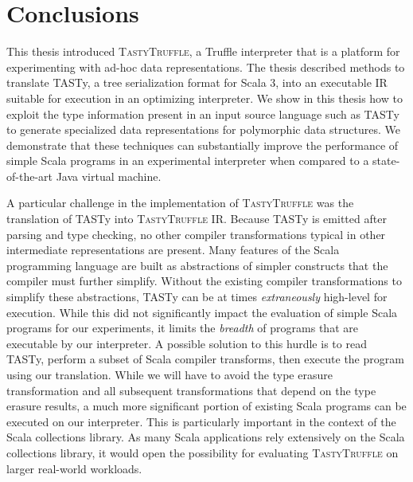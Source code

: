\chapter{Conclusions}

This thesis introduced \textsc{TastyTruffle}, a Truffle interpreter that is a platform for experimenting with ad-hoc data representations.
The thesis described methods to translate TASTy, a tree serialization format for Scala 3, into an executable IR suitable for execution in an optimizing interpreter.
We show in this thesis how to exploit the type information present in an input source language such as TASTy to generate specialized data representations for polymorphic data structures.
We demonstrate that these techniques can substantially improve the performance of simple Scala programs in an experimental interpreter when compared to a state-of-the-art Java virtual machine.

A particular challenge in the implementation of \textsc{TastyTruffle} was the translation of TASTy into \textsc{TastyTruffle} IR.
Because TASTy is emitted after parsing and type checking, no other compiler transformations typical in other intermediate representations are present.
Many features of the Scala programming language are built as abstractions of simpler constructs that the compiler must further simplify.
Without the existing compiler transformations to simplify these abstractions, TASTy can be at times \textit{extraneously} high-level for execution.
While this did not significantly impact the evaluation of simple Scala programs for our experiments, it limits the \textit{breadth} of programs that are executable by our interpreter.
A possible solution to this hurdle is to read TASTy, perform a subset of Scala compiler transforms, then execute the program using our translation.
While we will have to avoid the type erasure transformation and all subsequent transformations that depend on the type erasure results, a much more significant portion of existing Scala programs can be executed on our interpreter. 
This is particularly important in the context of the Scala collections library. 
As many Scala applications rely extensively on the Scala collections library, it would open the possibility for evaluating \textsc{TastyTruffle} on larger real-world workloads.


